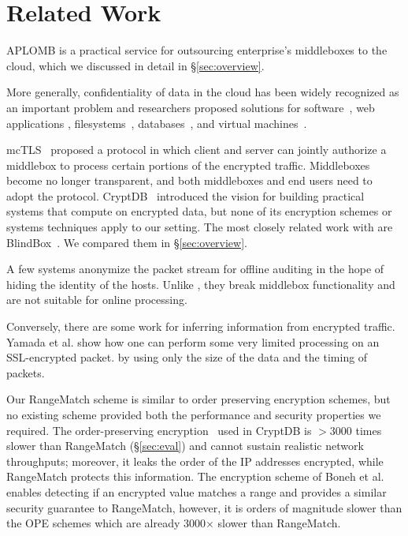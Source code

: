 
\section{Related Work}
\label{sec:related}

APLOMB is a practical service for outsourcing enterprise's middleboxes to the cloud, which we discussed in detail in \S\ref{sec:overview}.

More generally, confidentiality of data in the cloud has been widely recognized as an important problem and researchers proposed solutions for software~\cite{Baumann:Haven}, web applications \cite{giffin:hails, Mylar},  filesystems~\cite{blaze:cfs, kallahalla:plutus, goh:sirius},  databases~\cite{popa:cryptdb},  and virtual machines~\cite{Zhang:CloudVisor}. 

mcTLS~\cite{mctls} proposed a protocol in which client and server can jointly authorize a middlebox to process certain portions of the encrypted traffic. Middleboxes become no longer transparent, and both middleboxes and end users need to adopt the protocol. CryptDB~\cite{popa:cryptdb} introduced the vision for building practical systems that compute on encrypted data, but none of its encryption schemes or systems techniques apply to our setting. The most closely related work with \sys are BlindBox~\cite{blindbox}. We compared them in \S\ref{sec:overview}.

A few systems \cite{Vern:Anonymize06, Vern:Anonymize03} anonymize the packet stream for offline auditing in the hope of hiding the identity of the hosts. Unlike \sys, they break middlebox functionality and are not suitable for online processing. 

Conversely, there are some work for inferring information from encrypted traffic. Yamada et al.\cite{Yamada_IDS} show how one can perform some very limited processing on an SSL-encrypted packet. by using only the size of the data and the timing of packets.

Our RangeMatch scheme is similar to order preserving encryption schemes, but no existing scheme provided both the performance and security properties we required.
The order-preserving encryption~\cite{boldyreva:ope, popa:mope} used in CryptDB is 
 $>3000$ times slower than RangeMatch (\S\ref{sec:eval}) and cannot sustain realistic network throughputs; moreover, it leaks the order of the IP addresses encrypted, while RangeMatch protects this information. 
The encryption scheme of Boneh et al.~\cite{BonehRange} enables detecting if an encrypted value matches a range and provides a similar security guarantee to RangeMatch, however, it is orders of magnitude slower than the OPE schemes which are already 3000$\times$ slower than RangeMatch. 

